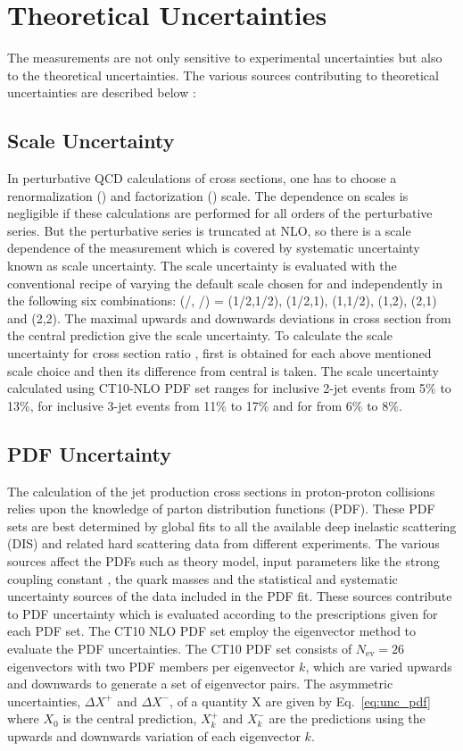\section{Theoretical Uncertainties}
The measurements are not only sensitive to experimental uncertainties but also to the theoretical uncertainties. The various sources contributing to theoretical uncertainties are described below : 

\subsection{Scale Uncertainty}
In perturbative QCD calculations of cross sections, one has to choose a renormalization (\mur) and factorization (\muf) scale. The dependence on scales is negligible if these calculations are performed for all orders of the perturbative series. But the perturbative series is truncated at NLO, so there is a scale dependence of the measurement which is covered by systematic uncertainty known as scale uncertainty. The scale uncertainty is evaluated with the conventional recipe of varying the default scale \httwo chosen for \mur and \muf independently in the following six combinations: (\mur/\httwo, \muf/\httwo) = (1/2,1/2), (1/2,1), (1,1/2), (1,2), (2,1) and (2,2). The maximal upwards and downwards deviations in cross section from the central prediction give the scale uncertainty. To calculate the scale uncertainty for cross section ratio \ratio, first \ratio is obtained for each above mentioned scale choice and then its difference from central \ratio is taken. The scale uncertainty calculated using CT10-NLO PDF set ranges for inclusive 2-jet events from 5\% to 13\%, for inclusive 3-jet events from 11\% to 17\% and for \ratio from 6\% to 8\%.

\subsection{PDF Uncertainty}
The calculation of the jet production cross sections in proton-proton collisions relies upon the knowledge of parton distribution functions (PDF). These PDF sets are best determined by global fits to all the available deep inelastic scattering (DIS) and related hard scattering data from different experiments. The various sources affect the PDFs such as theory model, input parameters like the strong coupling constant \alpsns, the quark masses and the statistical and systematic uncertainty sources of the data included in the PDF fit. These sources contribute to PDF uncertainty which is evaluated according to the prescriptions given for each PDF set. The CT10 NLO PDF set \cite{Lai:2010vv,Pumplin:2002vw} employ the eigenvector method to evaluate the PDF uncertainties. The CT10 PDF set consists of $N_\mathrm{ev}=26$ eigenvectors with two PDF members per eigenvector $k$, which are varied upwards and downwards to generate a set of eigenvector pairs. The asymmetric uncertainties, $\Delta X^{+}$ and $\Delta X^{-}$, of a quantity X are given by Eq.~\ref{eq:unc_pdf} where $X_0$ is the central prediction, $X^{+}_k$ and $X^{-}_k$ are the predictions using the upwards and downwards variation of each eigenvector $k$. 

